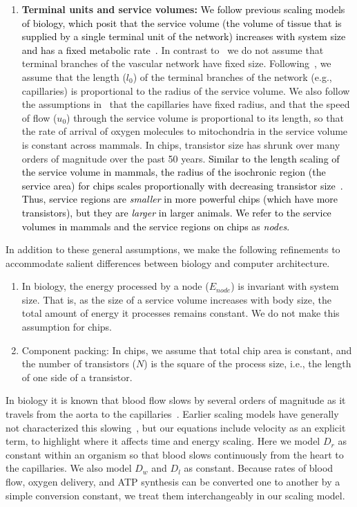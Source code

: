 \documentclass[12pt]{article}
\newcommand{\red}[1]{\textcolor{black}{#1}}
\begin{document}
\begin{enumerate}
\item {\bf Terminal units and service volumes:} \red{We follow previous scaling
    models of biology, which posit that the service volume (the volume of
    tissue that is supplied by a single terminal unit of the network) increases with
  system size and has a fixed metabolic rate~\cite{west97, banavar10}.}  In contrast to~\cite{west97} we do not assume that terminal branches of the vascular network have fixed size. Following~\cite{banavar10}, we assume that the length ($l_0$) of the terminal branches of the network (e.g., capillaries) is
  proportional to the radius of the service volume.  We also follow
  the assumptions in~\cite{banavar10} that the capillaries have fixed
  radius, and that the speed of flow ($u_0$) through the service volume is
  proportional to its length, so that the rate of arrival of oxygen
  molecules to mitochondria in the service volume is constant across mammals.   In
  chips, transistor size has shrunk over many orders of
  magnitude over the past 50 years.
\red{Similar to the length scaling of the service volume in mammals, the
radius of the isochronic region (the service area) for chips scales
proportionally with decreasing transistor size~\cite{moses08}. Thus,
	service regions are \emph{smaller} in more powerful chips (which have more transistors), but they are \emph{larger} in larger animals. We refer to the service volumes in mammals and the service regions on chips as \emph{nodes}.}
\end{enumerate}

In addition to these general assumptions, we make the following
refinements to accommodate salient differences between biology and computer architecture.
\begin{enumerate}
\item In biology, the energy processed by a node 
  ($E_{node}$) is invariant with system size. That is, as the size of a service volume
  increases with body size, the total amount of energy it processes
  remains constant. We do not make this assumption for chips.

\item Component packing: In chips, we assume that total chip area is constant, and the
  number of transistors ($N$) is the square of the process size, i.e.,
  the length of one side of a transistor. 

\end{enumerate}

\noindent 

In biology it is known that blood flow slows by several orders of magnitude as
it travels from the aorta to the capillaries~\cite{west97}.
Earlier scaling models have generally not characterized this
slowing~\cite{west97, banavar10}, but
our equations include velocity as an explicit term, to highlight where it affects time and energy
scaling. Here we model $D_r$ as constant within an organism so that blood slows continuously from the heart to the capillaries. We also model $D_w$ and $D_l$ as constant. Because rates of blood flow, oxygen delivery, and ATP synthesis can be converted one to another by a simple conversion constant, we treat them interchangeably in our scaling model.
\end{document}
